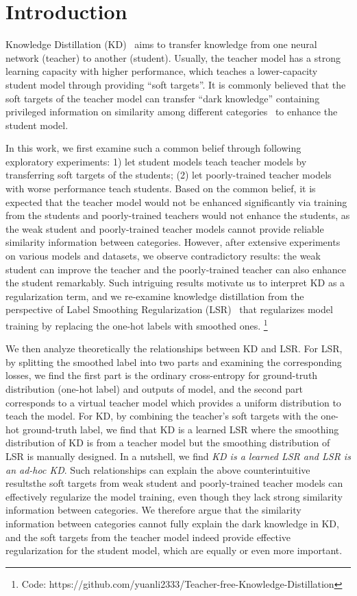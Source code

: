 \documentclass[10pt,twocolumn,letterpaper]{article}
\begin{document}
\section{Introduction}
Knowledge Distillation (KD)~\cite{hinton2015distilling} aims to transfer knowledge from one neural network (teacher) to another (student). Usually, the teacher model has a strong learning capacity with higher performance, which teaches a lower-capacity student model through providing ``soft targets''. It is commonly believed that the soft targets of the teacher model can transfer ``dark knowledge'' containing privileged information on similarity among different categories~\cite{hinton2015distilling} to enhance the student model.


In this work, we first examine such a common belief through following exploratory experiments:
1) let student models teach teacher models by transferring soft targets of the students; (2) let poorly-trained teacher models with worse performance teach students. 
Based on the common belief, it is expected that the teacher model would not be enhanced significantly via training from the students and poorly-trained teachers would not enhance the students, as the weak student and poorly-trained teacher models cannot provide reliable similarity information between categories. However, after extensive experiments on various models and datasets, we 
observe contradictory results: the weak student can improve the teacher and the poorly-trained teacher can also enhance the student remarkably. 
Such intriguing results motivate us to interpret KD as a regularization term, and we re-examine knowledge distillation from the perspective of Label Smoothing Regularization (LSR)~\cite{szegedy2016rethinking}
that regularizes model training by replacing the one-hot labels with smoothed ones. \footnote{Code: https://github.com/yuanli2333/Teacher-free-Knowledge-Distillation}


We then analyze theoretically the relationships between KD and LSR. For LSR, by splitting the smoothed label into two parts and examining the corresponding losses, we find the first part is the ordinary cross-entropy for ground-truth distribution (one-hot label) and outputs of model, and the second part corresponds to a virtual teacher model which provides a uniform distribution to teach the model. For KD, by combining the teacher's soft targets with the one-hot ground-truth label, we find that KD is a learned LSR where the smoothing distribution of KD is from a teacher model but the smoothing distribution of LSR is manually designed. In a nutshell, we find \textit{KD is a learned LSR and LSR is an ad-hoc KD}. Such relationships can explain the above counterintuitive results\textemdash the soft targets from weak student and poorly-trained teacher models can effectively regularize the model training, even though they lack strong similarity information between categories. We therefore argue that the similarity information between categories cannot fully explain the dark knowledge in KD, and the soft targets from the teacher model indeed provide effective regularization for the student model, which are equally or even more important.
\end{document}
